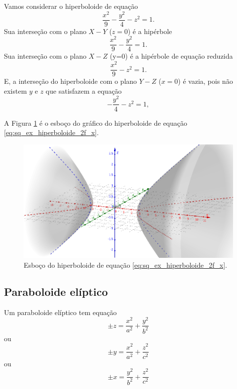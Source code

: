 \begin{ex}
  Vamos considerar o hiperboloide de equação
  \begin{equation}\label{eq:sq_ex_hiperboloide_2f_x}
    \frac{x^2}{9}-\frac{y^2}{4}-z^2=1.
  \end{equation}
  Sua interseção com o plano $X-Y$ ($z=0$) é a hipérbole
  \begin{equation}
    \frac{x^2}{9}-\frac{y^2}{4}=1.
  \end{equation}
  Sua interseção com o plano $X-Z$ (y=0) é a hipérbole de equação reduzida
  \begin{equation}
    \frac{x^2}{9}-z^2=1.
  \end{equation}
  E, a interseção do hiperboloide com o plano $Y-Z$ ($x=0$) é vazia, pois não existem $y$ e $z$ que satisfazem a equação
  \begin{equation}
    -\frac{y^2}{4}-z^2=1,
  \end{equation}
  
    A Figura \ref{fig:sq_ex_hiperboloide_2f_x} é o esboço do gráfico do hiperboloide de equação \eqref{eq:sq_ex_hiperboloide_2f_x}.

    \begin{figure}[H]
    \centering
    \includegraphics[width=\textwidth]{./cap_superquad/dados/fig_sq_ex_hiperboloide_2f_x/fig}
    \caption{Esboço do hiperboloide de equação \eqref{eq:sq_ex_hiperboloide_2f_x}.}
    \label{fig:sq_ex_hiperboloide_2f_x}
  \end{figure}
\end{ex}

\subsection{Paraboloide elíptico}

Um paraboloide elíptico tem equação
\begin{equation}
  \pm z = \frac{x^2}{a^2} + \frac{y^2}{b^2}
\end{equation}
ou
\begin{equation}
  \pm y = \frac{x^2}{a^2} + \frac{z^2}{c^2}
\end{equation}
ou
\begin{equation}
  \pm x = \frac{y^2}{b^2} + \frac{z^2}{c^2}
\end{equation}

